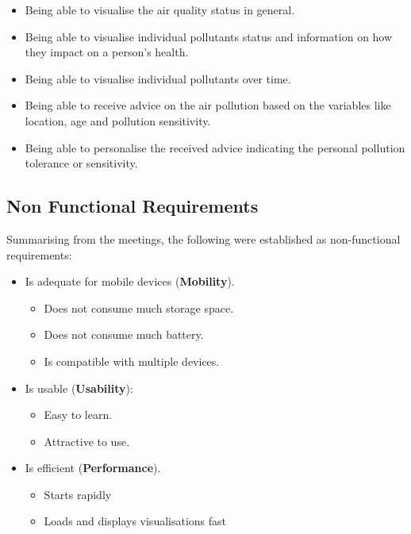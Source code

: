 \begin{itemize}
    \item Being able to visualise the air quality status in general.
    \item Being able to visualise individual pollutants status and information on how they impact on a person's health.
    \item Being able to visualise individual pollutants over time.
    \item Being able to receive advice on the air pollution based on the variables like location, age and pollution sensitivity. 
    \item Being able to personalise the received advice indicating the personal pollution tolerance or sensitivity.
\end{itemize}

\subsection{Non Functional Requirements}

Summarising from the meetings, the following were established as non-functional requirements:

\begin{itemize}
    \item Is adequate for mobile devices (\textbf{Mobility}).
    \begin{itemize}
        \item Does not consume much storage space.
        \item Does not consume much battery.
        \item Is compatible with multiple devices.
    \end{itemize}
    \item Is usable (\textbf{Usability}):
    \begin{itemize}
        \item Easy to learn.
        \item Attractive to use.
    \end{itemize}
    \item Is efficient (\textbf{Performance}).
    \begin{itemize}
        \item Starts rapidly
        \item Loads and displays visualisations fast
    \end{itemize}
\end{itemize}


